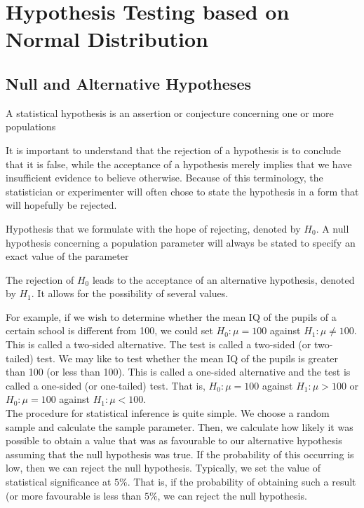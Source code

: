 \chapter{Hypothesis Testing based on Normal Distribution}

\section{Null and Alternative Hypotheses}

\begin{definition}
A statistical hypothesis is an assertion or conjecture concerning one or more populations
\end{definition}
{\color{blue}It is important to understand that the rejection of a hypothesis is to conclude that it is false, while the acceptance of a hypothesis merely implies that we have insufficient evidence to believe otherwise. Because of this terminology, the statistician or experimenter will often chose to state the hypothesis in a form that will hopefully be rejected.}
\begin{definition}
Hypothesis that we formulate with the hope of rejecting, denoted by $H_0$. A null hypothesis concerning a population parameter will always be stated to specify an exact value of the parameter
\end{definition}
\begin{definition}
The rejection of $H_0$ leads to the acceptance of an alternative hypothesis, denoted by $H_1$. It allows for the possibility of several values.
\end{definition}
For example, if we wish to determine whether the mean IQ of the pupils of a certain school is different from 100, we could set $H_0: \mu =  100$ against $H_1: \mu \neq 100$. This is called a two-sided alternative. The test is called a two-sided (or two-tailed) test. We may like to test whether the mean IQ of the pupils is greater than 100 (or less than 100). This is called a one-sided alternative and the test is called a one-sided (or one-tailed) test. That is, $H_0: \mu = 100$ against $H_1: \mu > 100$ or $H_0: \mu = 100$ against $H_1: \mu < 100$. \\
The procedure for statistical inference is quite simple. We choose a random sample and calculate the sample parameter. Then, we calculate how likely it was possible to obtain a value that was as favourable to our alternative hypothesis assuming that the null hypothesis was true. If the probability of this occurring is low, then we can reject the null hypothesis. Typically, we set the value of statistical significance at $5\%$. That is, if the probability of obtaining such a result (or more favourable is less than $5\%$, we can reject the null hypothesis. \\
